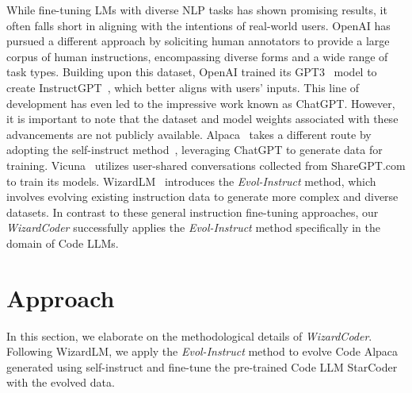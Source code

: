 \documentclass{article}
\newcommand{\name}{\emph{Evol-Instruct}}
\newcommand{\modelname}{\emph{WizardCoder}}
\begin{document}
While fine-tuning LMs with diverse NLP tasks has shown promising results, it often falls short in aligning with the intentions of real-world users. OpenAI has pursued a different approach by soliciting human annotators to provide a large corpus of human instructions, encompassing diverse forms and a wide range of task types. Building upon this dataset, OpenAI trained its GPT3~\cite{GPT3} model to create InstructGPT~\cite{DBLP:conf/nips/Ouyang0JAWMZASR22}, which better aligns with users' inputs. This line of development has even led to the impressive work known as ChatGPT. However, it is important to note that the dataset and model weights associated with these advancements are not publicly available. Alpaca~\cite{alpaca} takes a different route by adopting the self-instruct method~\cite{wang2022self}, leveraging ChatGPT to generate data for training. Vicuna~\cite{vicuna2023} utilizes user-shared conversations collected from ShareGPT.com to train its models. WizardLM~\cite{xu2023wizardlm} introduces the \name{} method, which involves evolving existing instruction data to generate more complex and diverse datasets. In contrast to these general instruction fine-tuning approaches, our \modelname{} successfully applies the \name{} method specifically in the domain of Code LLMs. \section{Approach}
In this section, we elaborate on the methodological details of \modelname{}. Following WizardLM, we apply the \name{} method to evolve Code Alpaca generated using self-instruct and fine-tune the pre-trained Code LLM StarCoder with the evolved data. 
\end{document}
